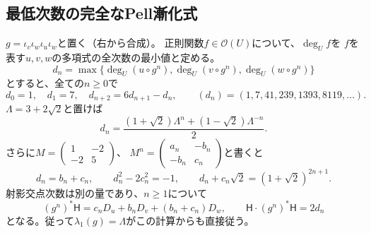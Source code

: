 \subsection{最低次数の完全なPell漸化式}
\begin{theorem}[係数に依存しない厳密な次数列]
\label{thm:pell-exact-degree}
$g=\iota_v\iota_w\iota_u\iota_w$と置く（右から合成）。
正則関数$f\in\mathcal O(U)$について、$\deg_U f$を
$f$を表す$u,v,w$の多項式の全次数の最小値と定める。
\[
 d_n=\max\{\deg_U(u\circ g^n),\deg_U(v\circ g^n),\deg_U(w\circ g^n)\}
\]
とすると、全ての$n\ge0$で
\begin{equation}\label{eq:pell-degree-sequence}
 d_0=1,\quad d_1=7,\quad d_{n+2}=6d_{n+1}-d_n,
 \qquad(d_n)=(1,7,41,239,1393,8119,\ldots).
\end{equation}
$\Lambda=3+2\sqrt2$と置けば
\[
 d_n=\frac{(1+\sqrt2)\Lambda^n+(1-\sqrt2)\Lambda^{-n}}2.
\]
さらに$M=\left(\begin{smallmatrix}1&-2\\-2&5\end{smallmatrix}\right)$、
$M^n=\left(\begin{smallmatrix}a_n&-b_n\\-b_n&c_n\end{smallmatrix}\right)$と書くと
\[
 d_n=b_n+c_n,\qquad d_n^2-2c_n^2=-1,
 \qquad d_n+c_n\sqrt2=(1+\sqrt2)^{2n+1}.
\]
射影交点次数は別の量であり、$n\ge1$について
\begin{equation}\label{eq:projective-pell-degree}
 (g^n)^*\mathsf H
 =c_nD_u+b_nD_v+(b_n+c_n)D_w,
 \qquad \mathsf H\cdot(g^n)^*\mathsf H=2d_n
\end{equation}
となる。従って$\lambda_1(g)=\Lambda$がこの計算からも直接従う。
\end{theorem}
